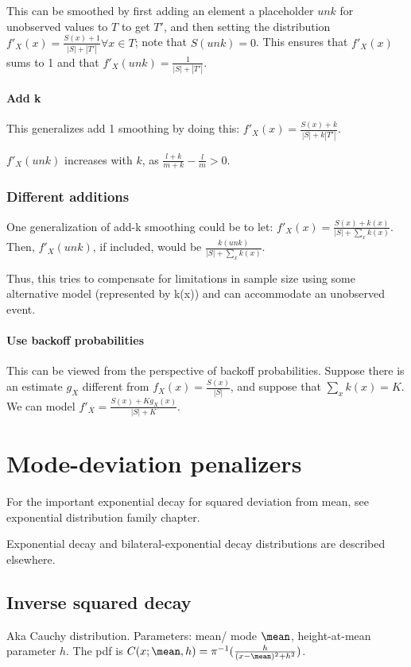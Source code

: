 \documentclass[oneside, article]{memoir}
\begin{document}
This can be smoothed by first adding an element a placeholder $unk$ for unobserved values to $T$ to get $T'$, and then setting the distribution $f'_X(x) = \frac{S(x) + 1}{|S| + |T'|} \forall x \in T$; note that $S(unk) = 0$. This ensures that $f'_X(x)$ sums to 1 and that $f'_X(unk)= \frac{1}{|S| + |T'|}$.

\subsubsection{Add k}
This generalizes add 1 smoothing by doing this:
$f'_X(x) = \frac{S(x) + k}{|S| + k|T'|}$.

$f'_X(unk)$ increases with $k$, as $\frac{l+k}{m + k} - \frac{l}{m} >0$.

\subsection{Different additions}
One generalization of add-k smoothing could be to let: $f'_X(x) = \frac{S(x) + k(x)}{|S| + \sum_x k(x)}$. Then, $f'_X(unk)$, if included, would be $\frac{k(unk)}{|S| + \sum_x k(x)}$.

Thus, this tries to compensate for limitations in sample size using some alternative model (represented by k(x)) and can accommodate an unobserved event.

\subsubsection{Use backoff probabilities}
This can be viewed from the perspective of backoff probabilities. Suppose there is an estimate $g_X$ different from $f_X(x) = \frac{S(x)}{|S|}$, and suppose that $\sum_x k(x) = K$. We can model $f'_X = \frac{S(x) + K g_X(x)}{|S| + K}$.

\chapter{Mode-deviation penalizers}
For the important exponential decay for squared deviation from mean, see exponential distribution family chapter.

Exponential decay and bilateral-exponential decay distributions are described elsewhere.

\section{Inverse squared decay}
Aka Cauchy distribution. Parameters: mean/ mode $\mean$, height-at-mean parameter $h$. The pdf is $C(x; \mean, h) = \pi^{-1} (\frac{h}{(x - \mean)^{2} + h^{2}})$.
\end{document}
